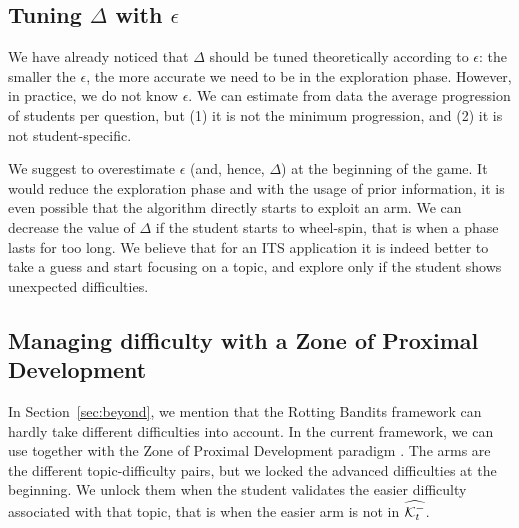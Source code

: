 \subsection{Tuning $\Delta$ with $\epsilon$}
We have already noticed that $\Delta$ should be tuned theoretically according to $\epsilon$: the smaller the $\epsilon$, the more accurate we need to be in the exploration phase. However, in practice, we do not know $\epsilon$. We can estimate from data the average progression of students per question, but (1) it is not the minimum progression, and (2) it is not student-specific. 

We suggest to overestimate $\epsilon$ (and, hence, $\Delta$) at the beginning of the game. It would reduce the exploration phase and with the usage of prior information, it is even possible that the algorithm directly starts to exploit an arm. We can decrease the value of $\Delta$ if the student starts to wheel-spin, that is when a phase lasts for too long. We believe that for an ITS application it is indeed better to take a guess and start focusing on a topic, and explore only if the student shows unexpected difficulties.

\subsection{Managing difficulty with a Zone of Proximal Development}
In Section~\ref{sec:beyond}, we mention that the Rotting Bandits framework can hardly take different difficulties into account. In the current framework, we can use \FLUTE together with the Zone of Proximal Development paradigm \citep{luckin2001designing, clement2015multi}. The arms are the different topic-difficulty pairs, but we locked the advanced difficulties at the beginning. We unlock them when the student validates the easier difficulty associated with that topic, that is when the easier arm is not in $\widehat{\mathcal{K}_t^-}$.
